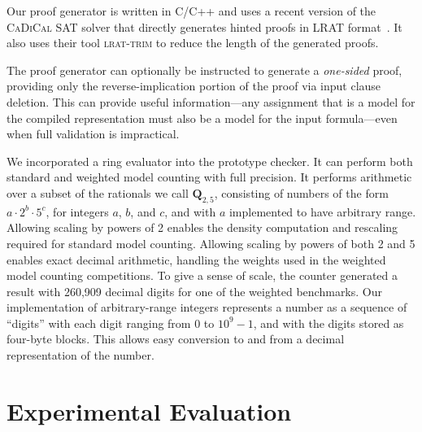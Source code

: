 \documentclass[twoside,11pt]{article}
\newcommand{\drational}{\textbf{Q}_{2,5}}
\newcommand{\progname}[1]{\textsc{#1}}
\newcommand{\cadical}{\progname{CaDiCal}}
\newcommand{\ltrim}{\progname{lrat-trim}}
\begin{document}
Our proof generator is written in C/C++ and uses a recent version of
the \cadical{} SAT solver that directly generates hinted proofs in
LRAT format~\cite{biere:sat:2023}.  It also uses their tool \ltrim{}
to reduce the length of the generated proofs.

The proof generator can optionally be instructed to generate a {\em
one-sided} proof, providing only the reverse-implication portion of the proof via
input clause deletion.  This can provide useful information---any
assignment that is a model for the compiled representation
must also be a model for the input formula---even when
full validation is impractical.

We incorporated a ring evaluator into the prototype checker.  It can
perform both standard and weighted model counting with full precision.
It performs arithmetic over a subset of the rationals we call
$\drational$, consisting of numbers of the form $a \cdot 2^{b} \cdot
5^{c}$, for integers $a$, $b$, and $c$, and with $a$ implemented to
have arbitrary range.  Allowing scaling by powers of 2 enables the
density computation and rescaling required for standard model
counting.  Allowing scaling by powers of both 2 and 5 enables exact
decimal arithmetic, handling the weights used in the weighted model
counting competitions.  To give a sense of scale, the counter
generated a result with 260,909 decimal digits for one of the weighted
benchmarks.  Our implementation of arbitrary-range integers represents
a number as a sequence of ``digits'' with each digit ranging from $0$
to $10^9-1$, and with the digits stored as four-byte blocks.  This
allows easy conversion to and from a decimal representation of the
number.


\section{Experimental Evaluation}
\label{sect:experimental}

\end{document}
